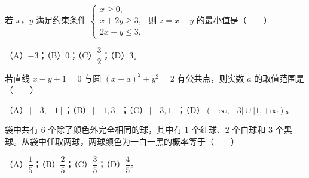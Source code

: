 \begin{question}
若 $x$，$y$ 满足约束条件 $\begin{cases}x\geqslant0,\\x+2y\geqslant3,\\2x+y\leqslant3,\end{cases}$ 则 $z=x-y$ 的最小值是\mbox{（　　）}

（A）$-3$；（B）$0$；（C）$\dfrac32$；（D）$3$。

\end{question}
\begin{question}
若直线 $x-y+1=0$ 与圆 $(x-a)^2+y^2=2$ 有公共点，则实数 $a$ 的取值范围是\mbox{（　　）}

（A）$[-3,-1]$；（B）$[-1,3]$；（C）$[-3,1]$；（D）$(-\infty,-3]\cup[1,+\infty)$。

\end{question}
\begingroup
\renewenvironment{question}{\Needspace{0.2\textheight}}{}
\begin{question}
袋中共有 $6$ 个除了颜色外完全相同的球，其中有 $1$ 个红球、$2$ 个白球和 $3$ 个黑球。从袋中任取两球，两球颜色为一白一黑的概率等于\mbox{（　　）}

（A）$\dfrac15$；（B）$\dfrac25$；（C）$\dfrac35$；（D）$\dfrac45$。

\end{question}
\endgroup
{}

